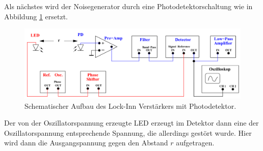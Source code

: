 \noindent Als nächstes wird der Noisegenerator durch eine Photodetektorschaltung wie in Abbildung \ref{fig:photo} ersetzt.
\begin{figure}[H]
    \centering
    \includegraphics{Bilder/PhotoLockInn}
    \caption{Schematischer Aufbau des Lock-Inn Verstärkers mit Photodetektor. \cite{V303}}
    \label{fig:photo}
\end{figure}
Der von der Oszillatorspannung erzeugte LED erzeugt im Detektor dann eine der Oszillatorspannung entsprechende Spannung, die 
allerdings gestört wurde. Hier wird dann die Ausgangspannung gegen den Abstand $r$ aufgetragen.

\label{sec:Durchführung}
